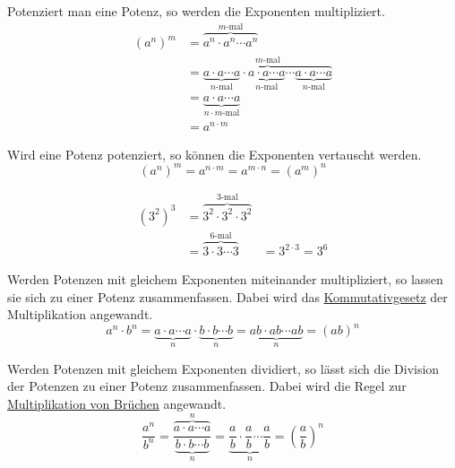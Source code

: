 \begin{regel}
 Potenziert man eine Potenz, so werden die Exponenten multipliziert.
 \begin{align*}
  \left(a^n\right)^m &= \overbrace{a^n \cdot a^n \cdots a^n}^{m\text{-mal}}\\
  &= \overbrace{\underbrace{a\cdot a \cdots a}_{n\text{-mal}} \cdot \underbrace{a\cdot a \cdots a}_{n\text{-mal}} \cdots \underbrace{a\cdot a \cdots a}_{n\text{-mal}}}^{m\text{-mal}}\\
  &= \underbrace{a\cdot a \cdots a}_{n\cdot m\text{-mal}}\\
  &= a^{n\cdot m}
 \end{align*}
\end{regel}

\begin{folg}
Wird eine Potenz potenziert, so können die Exponenten vertauscht werden.
 \begin{equation*}
  \left(a^n\right)^m = a^{n\cdot m} = a^{m\cdot n} = \left(a^m\right)^n
 \end{equation*}

\end{folg}

\begin{bsp}
 \begin{align*}
  \left(3^2\right)^3 &= \overbrace{3^2\cdot 3^2\cdot 3^2}^{3\text{-mal}} \\
  &= \overbrace{3\cdot 3 \cdots 3}^{6\text{-mal}}
  &= 3^{2\cdot 3} = 3^6
 \end{align*}
\end{bsp}

\begin{folg}\label{folg:prodpot}
 Werden Potenzen mit gleichem Exponenten miteinander multipliziert, so lassen sie sich zu einer Potenz zusammenfassen.
 Dabei wird das \hyperref[ssec:komm]{Kommutativgesetz} der Multiplikation angewandt.
 \begin{equation*}
  a^n \cdot b^n = \underbrace{a\cdot a \cdots a}_{n}\cdot\underbrace{b\cdot b\cdots b}_n = \underbrace{ab \cdot ab \cdots ab}_n = (ab)^n
 \end{equation*}

\end{folg}

\begin{folg}\label{folg:quotpot}
 Werden Potenzen mit gleichem Exponenten dividiert, so lässt sich die Division der Potenzen zu einer Potenz zusammenfassen.
 Dabei wird die Regel zur \hyperref[reg:mulfrac]{Multiplikation von Brüchen} angewandt.
 \begin{equation*}
  \frac{a^n}{b^n} = \frac{\overbrace{a\cdot a \cdots a}^{n}}{\underbrace{b\cdot b\cdots b}_n}= \underbrace{\frac{a}{b} \cdot \frac{a}{b} \cdots \frac{a}{b}}_n = \left(\frac{a}{b}\right)^n
 \end{equation*}
\end{folg}


